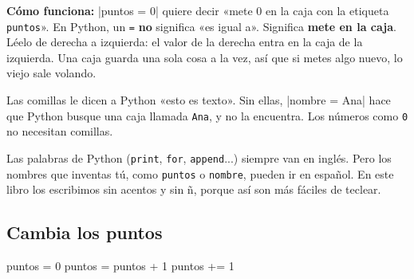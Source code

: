 \begin{center}
\end{center}

\textbf{Cómo funciona:} \py|puntos = 0| quiere decir «mete 0 en la caja con la etiqueta \texttt{puntos}». En Python, un \texttt{=} \textbf{no} significa «es igual a». Significa \textbf{mete en la caja}. Léelo de derecha a izquierda: el valor de la derecha entra en la caja de la izquierda. Una caja guarda una sola cosa a la vez, así que si metes algo nuevo, lo viejo sale volando.

\begin{think}
Las comillas le dicen a Python «esto es texto». Sin ellas, \py|nombre = Ana| hace que Python busque una caja llamada \texttt{Ana}, y no la encuentra. Los números como \texttt{0} no necesitan comillas.
\end{think}

\begin{think}
Las palabras de Python (\texttt{print}, \texttt{for}, \texttt{append}...) siempre van en inglés. Pero los nombres que inventas tú, como \texttt{puntos} o \texttt{nombre}, pueden ir en español. En este libro los escribimos sin acentos y sin ñ, porque así son más fáciles de teclear.
\end{think}

\subsection*{Cambia los puntos}

\begin{tcbraster}[raster columns=2, raster equal height=rows, raster column skip=12pt, raster valign=center]
\begin{tcolorbox}[colback=white, colframe=white, boxrule=0pt, valign=center]
\begin{scratch}
\end{scratch}
\end{tcolorbox}
\begin{code}
puntos = 0
puntos = puntos + 1
puntos += 1
\end{code}
\end{tcbraster}

